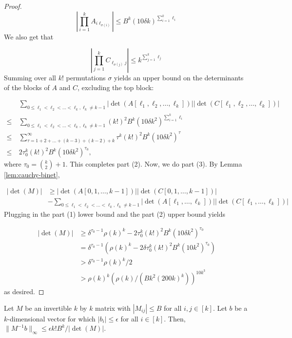 \begin{proof}
$$\left|\prod_{i=1}^k A_{i\ell_{\sigma(i)}} \right|\le B^k (10\delta k)^{\sum_{i=1}^k \ell_i}$$
We also get that

$$\left|\prod_{j=1}^k C_{\ell_{\sigma(j)}j}\right|\le k^{\sum_{j=1}^k \ell_j}$$
Summing over all $k!$ permutations $\sigma$ yields an upper bound on the determinants of the blocks of $A$ and $C$, excluding the top block:

\begin{align*}
 & ~ \sum_{0\le \ell_1 < \ell_2 < \hdots < \ell_k, \ell_k\ne k-1} |\det(A[\ell_1,\ell_2,\hdots,\ell_k])| |\det(C[\ell_1,\ell_2,\hdots,\ell_k])| \\
\le & ~ \sum_{0\le \ell_1 < \ell_2 < \hdots < \ell_k, \ell_k\ne k-1} (k!)^2 B^k (10\delta k^2)^{\sum_{i=1}^k \ell_i}\\
\le & ~ \sum_{\tau = 1 + 2 + \hdots + (k-3) + (k-2) + k}^{\infty} \tau^k (k!)^2 B^k (10\delta k^2)^{\tau}\\
\le & ~ 2\tau_0^k (k!)^2 B^k (10\delta k^2)^{\tau_0},
\end{align*}
where $\tau_0 = \binom{k}{2} + 1$. This completes part (2). Now, we do part (3). By Lemma \ref{lem:cauchy-binet},

\begin{align*}
|\det(M)| &\ge |\det(A[0,1,\hdots,k-1])| |\det(C[0,1,\hdots,k-1])|\\
&- \sum_{0\le \ell_1<\ell_2<\hdots<\ell_k, \ell_k\ne k-1} |\det(A[\ell_1,\hdots,\ell_k])| |\det(C[\ell_1,\hdots,\ell_k])|
\end{align*}
Plugging in the part (1) lower bound and the part (2) upper bound yields

\begin{align*}
|\det(M)| &\ge \delta^{\tau_0-1}\rho(k)^k - 2\tau_0^k (k!)^2 B^k (10\delta k^2)^{\tau_0}\\
&= \delta^{\tau_0-1}\left(\rho(k)^k - 2\delta\tau_0^k (k!)^2 B^k (10k^2)^{\tau_0}\right)\\
&> \delta^{\tau_0-1} \rho(k)^k/2\\
&> \rho(k)^k(\rho(k)/(Bk^2(200k)^k))^{10k^3}
\end{align*}
as desired.
\end{proof}

\begin{lemma} \label{lem:step5}
Let $M$ be an invertible $k$ by $k$ matrix with $|M_{ij}|\le B$ for all $i,j\in [k]$. Let $b$ be a $k$-dimensional vector for which $|b_i|\le \epsilon$ for all $i\in [k]$. Then, $\|M^{-1}b\|_{\infty}\le \epsilon k! B^k / |\det(M)|$.
\label{lemma:step5}
\end{lemma} 

